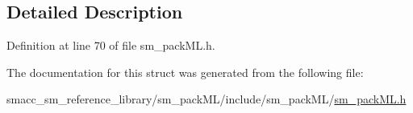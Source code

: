 \subsection{Detailed Description}


Definition at line 70 of file sm\+\_\+pack\+M\+L.\+h.



The documentation for this struct was generated from the following file\+:\begin{DoxyCompactItemize}
\item 
smacc\+\_\+sm\+\_\+reference\+\_\+library/sm\+\_\+pack\+M\+L/include/sm\+\_\+pack\+M\+L/\hyperlink{sm__packML_8h}{sm\+\_\+pack\+M\+L.\+h}\end{DoxyCompactItemize}
